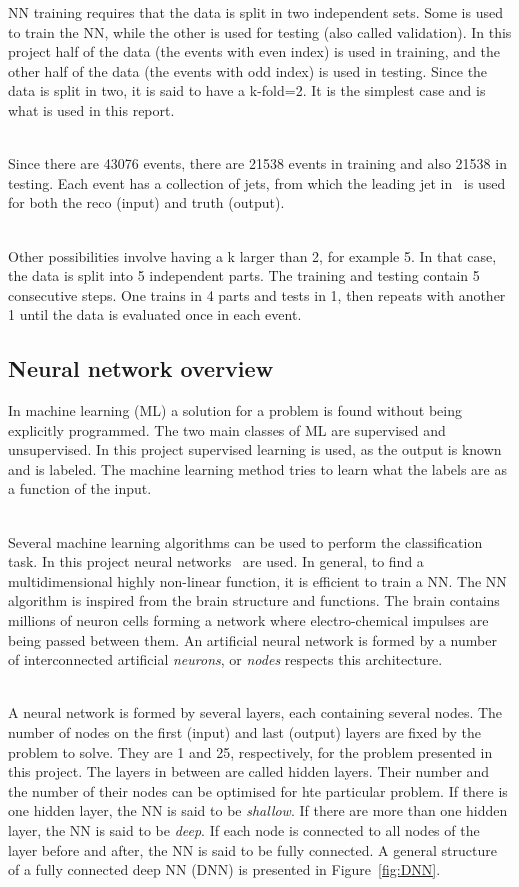 NN training requires that the data is split in two independent sets. Some is used to train the NN, while the other is used for testing (also called validation). In this project half of the data (the events with even index) is used in training, and the other half of the data (the events with odd index) is used in testing. Since the data is split in two, it is said to have a k-fold=2. It is the simplest case and is what is used in this report.

\ \\Since there are 43076 events, there are 21538 events in training and also 21538 in testing. Each event has a collection of jets, from which the leading jet in \pt~is used for both the reco (input) and truth (output).

\ \\Other possibilities involve having a k larger than 2, for example 5. In that case, the data is split into 5 independent parts. The training and testing contain 5 consecutive steps. One trains in 4 parts and tests in 1, then repeats with another 1 until the data is evaluated once in each event.

\subsection{Neural network overview}
\label{sec:NeuralNetworkOverview}

In machine learning (ML) a solution for a problem is found without being explicitly programmed. The two main classes of ML are supervised and unsupervised. In this project supervised learning is used, as the output is known and is labeled. The machine learning method tries to learn what the labels are as a function of the input.

\ \\Several machine learning algorithms can be used to perform the classification task. In this project neural networks~\cite{AndrewNg} are used. In general, to find a multidimensional highly non-linear function, it is efficient to train a NN. The NN algorithm is inspired from the brain structure and functions. The brain contains millions of neuron cells forming a network where electro-chemical impulses are being passed between them. An artificial neural network is formed by a number of interconnected artificial \emph{neurons}, or \emph{nodes} respects this architecture.

\ \\A neural network is formed by several layers, each containing several nodes. The number of nodes on the first (input) and last (output) layers are fixed by the problem to solve. They are 1 and 25, respectively, for the problem presented in this project. The layers in between are called hidden layers. Their number and the number of their nodes can be optimised for hte particular problem. If there is one hidden layer, the NN is said to be \emph{shallow}. If there are more than one hidden layer, the NN is said to be \emph{deep}. If each node is connected to all nodes of the layer before and after, the NN is said to be fully connected. A general structure of a fully connected deep NN (DNN) is presented in Figure~\ref{fig:DNN}.

